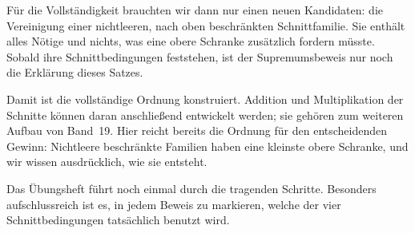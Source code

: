 Für die Vollständigkeit brauchten wir dann nur einen neuen Kandidaten:
die Vereinigung einer nichtleeren, nach oben beschränkten Schnittfamilie.
Sie enthält alles Nötige und nichts, was eine obere Schranke zusätzlich
fordern müsste. Sobald ihre Schnittbedingungen feststehen, ist der
Supremumsbeweis nur noch die Erklärung dieses Satzes.

\begin{center}
\end{center}

Damit ist die vollständige Ordnung konstruiert. Addition und
Multiplikation der Schnitte können daran anschließend entwickelt werden;
sie gehören zum weiteren Aufbau von Band~19.
Hier reicht bereits die Ordnung für den entscheidenden Gewinn:
Nichtleere beschränkte Familien haben eine kleinste obere Schranke,
und wir wissen ausdrücklich, wie sie entsteht.

Das Übungsheft führt noch einmal durch die tragenden Schritte.
Besonders aufschlussreich ist es, in jedem Beweis zu markieren,
welche der vier Schnittbedingungen tatsächlich benutzt wird.
